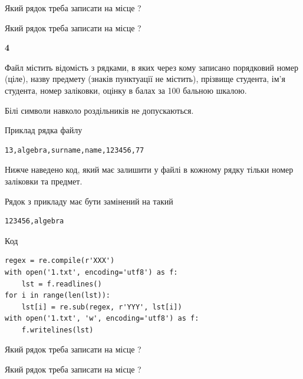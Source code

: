 Який рядок треба записати на місце  ?\par
\vspace{5mm}


Який рядок треба записати на місце  ?\par


\newpage

{\begin {center}\textbf{ 4}\end {center}}\par
Файл  містить відомість з рядками, в яких через кому записано поряд\-ковий номер (ціле), назву предмету (знаків пунктуації не містить), прізвище студента, ім'я студента, номер заліковки, оцінку в балах за 100 бальною шкалою.

Білі символи навколо роздільників не допускаються.

Приклад рядка файлу



\begin{verbatim}
13,algebra,surname,name,123456,77
\end{verbatim}


Нижче наведено код, який має залишити у файлі в кожному рядку тільки номер заліковки та предмет.

Рядок з прикладу має бути замінений на такий



\begin{verbatim}
123456,algebra
\end{verbatim}




Код



\begin{verbatim}
regex = re.compile(r'XXX')
with open('1.txt', encoding='utf8') as f:
    lst = f.readlines()
for i in range(len(lst)):
    lst[i] = re.sub(regex, r'YYY', lst[i])
with open('1.txt', 'w', encoding='utf8') as f:
    f.writelines(lst)
\end{verbatim}









Який рядок треба записати на місце  ?\par
\vspace{5mm}


Який рядок треба записати на місце  ?\par


